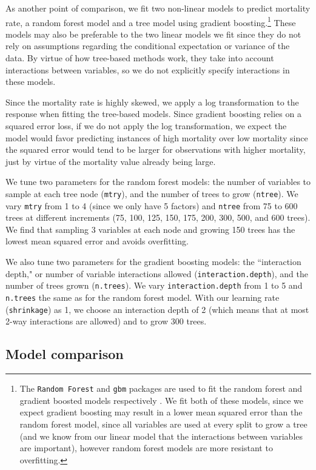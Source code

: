 \documentclass[letterpaper, 11pt]{article}
\begin{document}
As another point of comparison, we fit two non-linear models to predict mortality rate, a random forest model and a tree model using gradient boosting.\footnote{The \texttt{Random Forest} and \texttt{gbm} packages are used to fit the random forest and gradient boosted models respectively \cite{gbm} \cite{randomForest}. We fit both of these models, since we expect gradient boosting may result in a lower mean squared error than the random forest model, since all variables are used at every split to grow a tree (and we know from our linear model that the interactions between variables are important), however random forest models are more resistant to overfitting.} These models may also be preferable to the two linear models we fit since they do not rely on assumptions regarding the conditional expectation or variance of the data.   By virtue of how tree-based methods work, they take into account interactions between variables, so we do not explicitly specify interactions in these models.

Since the mortality rate is highly skewed, we apply a log transformation to the response when fitting the tree-based models. Since gradient boosting relies on a squared error loss, if we do not apply the log transformation, we expect the model would favor predicting instances of high mortality over low mortality since the squared error would tend to be larger for observations with higher mortality, just by virtue of the mortality value already being large.

We tune two parameters for the random forest models: the number of variables to sample at each tree node (\texttt{mtry}), and the number of trees to grow (\texttt{ntree}). We vary \texttt{mtry} from 1 to 4 (since we only have 5 factors) and \texttt{ntree} from 75 to 600 trees at different increments (75, 100, 125, 150, 175, 200, 300, 500, and 600 trees). We find that sampling 3 variables at each node and growing 150 trees has the lowest mean squared error and avoids overfitting.

We also tune two parameters for the gradient boosting models: the ``interaction depth," or number of variable interactions allowed (\texttt{interaction.depth}), and the number of trees grown (\texttt{n.trees}). We vary \texttt{interaction.depth} from 1 to 5 and \texttt{n.trees} the same as for the random forest model. With our learning rate (\texttt{shrinkage}) as 1, we choose an interaction depth of 2 (which means that at most 2-way interactions are allowed) and to grow 300 trees.

\subsection{Model comparison}
\end{document}
